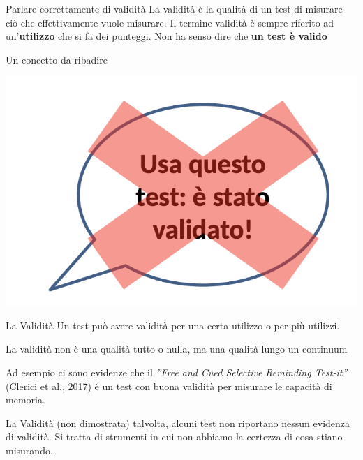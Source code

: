 \documentclass[
  ignorenonframetext,
]{beamer}
\begin{document}
\begin{frame}{Parlare correttamente di validità}
\label{parlare-correttamente-di-validituxe0}
La validità è la qualità di un test di misurare ciò che effettivamente
vuole misurare. Il termine validità è sempre riferito ad
un'\textbf{utilizzo} che si fa dei punteggi. \vfill \pause Non ha senso
dire che \textbf{un test è valido} \vfill \pause

\begin{center}
\end{center}
\end{frame}

\begin{frame}{Un concetto da ribadire}
\label{un-concetto-da-ribadire}
\begin{center}
\includegraphics[width=0.5\linewidth,height=\textheight,keepaspectratio]{Figures/Usa_questo_test.png}
\end{center}
\end{frame}

\begin{frame}{La Validità}
\label{la-validituxe0}
Un test può avere validità per una certa utilizzo o per più utilizzi.

La validità non è una qualità tutto-o-nulla, ma una qualità lungo un
continuum

Ad esempio ci sono evidenze che il \emph{''Free and Cued Selective
Reminding Test-it''} (Clerici et al., 2017) è un test con buona validità
per misurare le capacità di memoria.
\end{frame}

\begin{frame}{La Validità (non dimostrata)}
\label{la-validituxe0-non-dimostrata}
talvolta, alcuni test non riportano nessun evidenza di validità. Si
tratta di strumenti in cui non abbiamo la certezza di cosa stiano
misurando.
\end{frame}
\end{document}

